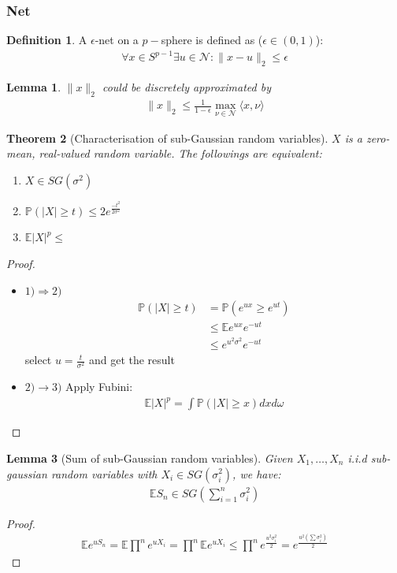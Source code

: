 \documentclass[a4paper,12pt, oneside, fleqn]{book}
\newtheorem{theorem}{Theorem}[section]
\newtheorem{lemma}[theorem]{Lemma}
\theoremstyle{definition}
\newtheorem{definition}{Definition}[section]
\theoremstyle{remark}
\begin{document}
\subsubsection{Net}
\begin{definition}
	A $\epsilon$-net on a $p-$sphere is defined as ($\epsilon \in(0, 1)$):
	\begin{align*}
		\forall x \in S^{p-1} \exists u \in \mathcal{N}: \|x - u\|_2 \leq \epsilon
	\end{align*}
\end{definition}

\begin{lemma}
	$\|x\|_2$ could be discretely approximated by
	\begin{align*}
		\|x\|_2 \leq \frac{1}{1 - \epsilon} \max_{ \nu \in \mathcal{N}} \langle x, \nu \rangle
	\end{align*}
\end{lemma}

\begin{theorem}[Characterisation of sub-Gaussian random variables]
$X$ is a zero-mean, real-valued random variable. The followings are equivalent:
\begin{enumerate}
	\item $X \in SG(\sigma^2)$
	\item $\mathbb{P}(|X| \geq t) \leq 2e^{\frac{-t^2}{2\sigma^2}}$
	\item $\mathbb{E} |X|^p \leq $
\end{enumerate}	
\end{theorem}
\begin{proof}
$\quad$
\begin{itemize}
	\item $1)\Rightarrow 2)$
	\begin{align*}
		\mathbb{P}(|X| \geq t) &= \mathbb{P}(e^{ux} \geq e^{ut})\\
		&\leq \mathbb{E}e^{ux} e^{-ut}\\
		&\leq e^{u^2 \sigma^2} e^{-ut}
	\end{align*}
	select $u = \frac{t}{\sigma^2}$ and get the result
	\item $2) \rightarrow 3)$ Apply Fubini:
	\begin{align*}
		\mathbb{E}|X|^p = \int \mathbb{P}(|X| \geq x) dxd\omega
	\end{align*}
\end{itemize}
\end{proof}

\begin{lemma}[Sum of sub-Gaussian random variables]
	Given $X_1, \dots, X_n$ i.i.d sub-gaussian random variables with $X_i \in SG(\sigma_i^2)$, we have:
	\begin{align*}
		\mathbb{E}S_n \in SG(\sum_{i = 1}^n \sigma_i^2)
	\end{align*}
\end{lemma}
\begin{proof}
\begin{align*}
	\mathbb{E}e^{u S_n} = \mathbb{E}\prod^n e^{uX_i} = \prod^n \mathbb{E}e^{uX_i} \leq \prod^n e^{\frac{u^2 \sigma_i^2}{2}} = e^{\frac{u^2(\sum \sigma_i^2)}{2}}
\end{align*}
\end{proof}
\end{document}
